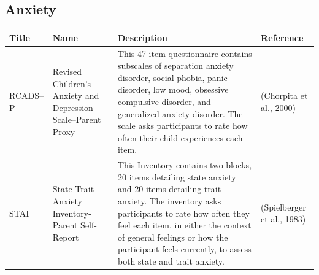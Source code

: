 \documentclass[]{book}
\begin{document}
\hypertarget{anxiety}{%
\subsection{Anxiety}\label{anxiety}}

\begin{longtable}[]{@{}llll@{}}
\toprule
\begin{minipage}[b]{0.22\columnwidth}\raggedright
Title\strut
\end{minipage} & \begin{minipage}[b]{0.27\columnwidth}\raggedright
Name\strut
\end{minipage} & \begin{minipage}[b]{0.22\columnwidth}\raggedright
Description\strut
\end{minipage} & \begin{minipage}[b]{0.18\columnwidth}\raggedright
Reference\strut
\end{minipage}\tabularnewline
\midrule
\endhead
\begin{minipage}[t]{0.22\columnwidth}\raggedright
RCADS--P\strut
\end{minipage} & \begin{minipage}[t]{0.27\columnwidth}\raggedright
Revised Children's Anxiety and Depression Scale--Parent Proxy\strut
\end{minipage} & \begin{minipage}[t]{0.22\columnwidth}\raggedright
This 47 item questionnaire contains subscales of separation anxiety disorder, social phobia, panic disorder, low mood, obsessive compulsive disorder, and generalized anxiety disorder. The scale asks participants to rate how often their child experiences each item.\strut
\end{minipage} & \begin{minipage}[t]{0.18\columnwidth}\raggedright
(Chorpita et al., 2000)\strut
\end{minipage}\tabularnewline
\begin{minipage}[t]{0.22\columnwidth}\raggedright
STAI\strut
\end{minipage} & \begin{minipage}[t]{0.27\columnwidth}\raggedright
State-Trait Anxiety Inventory-Parent Self-Report\strut
\end{minipage} & \begin{minipage}[t]{0.22\columnwidth}\raggedright
This Inventory contains two blocks, 20 items detailing state anxiety and 20 items detailing trait anxiety. The inventory asks participants to rate how often they feel each item, in either the context of general feelings or how the participant feels currently, to assess both state and trait anxiety.\strut
\end{minipage} & \begin{minipage}[t]{0.18\columnwidth}\raggedright
(Spielberger et al., 1983)\strut
\end{minipage}\tabularnewline
\bottomrule
\end{longtable}
\end{document}
